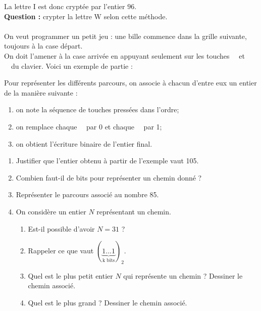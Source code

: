 \documentclass[a4paper,10pt]{book}
\newcommand{\carre}[2]
{\draw[thick,fill  = UGLiOrange!50] (#1+.1,#2+.1) rectangle (#1+.9,#2.9);
}
\begin{document}
La lettre \og I \fg est donc cryptée par l'entier $96$.\\

\textbf{Question :} crypter la lettre \og W  \fg{} selon cette méthode.\\


\\

On veut programmer un petit jeu : une bille commence dans la grille suivante, toujours à la case départ.\\
On doit l'amener à la case arrivée en appuyant seulement sur les touches \touche{$\rightarrow$}\ \ et \touche{$\downarrow$}\ \ du clavier.
Voici un exemple de partie :
\begin{center}
\end{center}

Pour représenter les différents parcours, on associe à chacun d'entre eux un entier de la manière suivante :
\begin{enumerate}[--]
	\item 	on note la séquence de touches pressées dans l'ordre;
	\item 	on remplace chaque \touche{$\downarrow$}\ \ par 0 et chaque \touche{$\rightarrow$}\ \ par 1;
	\item 	on obtient l'écriture binaire de l'entier final.
\end{enumerate}
\begin{enumerate}[\bfseries 1.]
	\item 	Justifier que l'entier obtenu à partir de l'exemple vaut 105.
	\item 	Combien faut-il de bits pour représenter un chemin donné ?
	\item 	Représenter le parcours associé au nombre 85.
	\item 	On considère un entier $N$ représentant un chemin.
	\begin{enumerate}[\bfseries a.]
		\item 	Est-il possible d'avoir $N=31$ ?
		\item 	Rappeler ce que vaut $ (\underbrace{1...1}_{\text{k bits}})_2$.
		\item 	Quel est le plus petit entier $N$ qui représente un chemin ? Dessiner le chemin associé.
		\item 	Quel est le plus grand ? Dessiner le chemin associé.\\
	\end{enumerate}
\end{enumerate}
\end{document}
